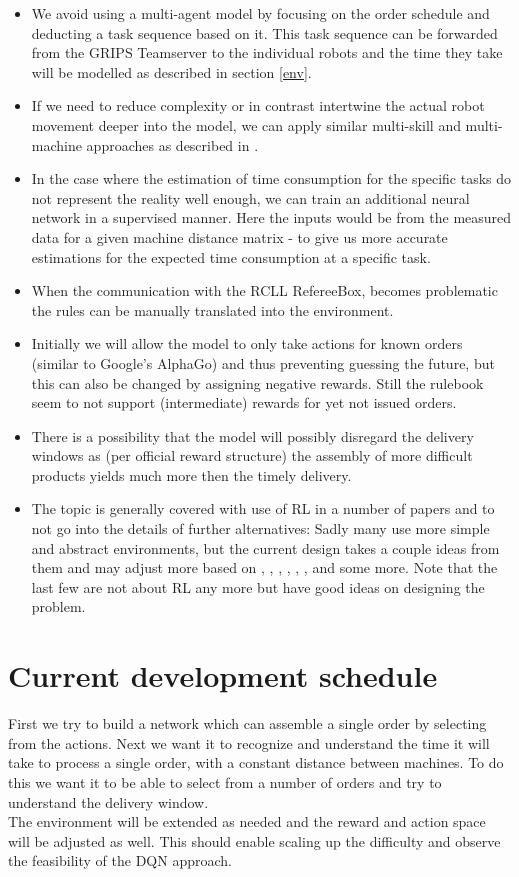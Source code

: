\documentclass[runningheads,envcountsect]{llncs}
\begin{document}
\begin{itemize}
  \item We avoid using a multi-agent model by focusing on the order schedule and deducting a task sequence based on it. This task sequence can be forwarded from the GRIPS Teamserver to the individual robots and the time they take will be modelled as described in section \ref{env}.
  \item If we need to reduce complexity or in contrast intertwine the actual robot movement deeper into the model, we can apply similar multi-skill and multi-machine approaches as described in \cite{qu2016optimized}.
  \item In the case where the estimation of time consumption for the specific tasks do not represent the reality well enough, we can train an additional neural network in a supervised manner. Here the inputs would be from the measured data for a given machine distance matrix - to give us more accurate estimations for the expected time consumption at a specific task.
  \item When the communication with the RCLL RefereeBox, becomes problematic the rules can be manually translated into the environment.
  \item Initially we will allow the model to only take actions for known orders (similar to Google's AlphaGo) and thus preventing guessing the future, but this can also be changed by assigning negative rewards. Still the rulebook seem to not support (intermediate) rewards for yet not issued orders.
  \item There is a possibility that the model will possibly disregard the delivery windows as (per official reward structure) the assembly of more difficult products yields much more then the timely delivery.
  \item The topic is generally covered with use of RL in a number of papers and to not go into the details of further alternatives: Sadly many use more simple and abstract environments, but the current design takes a couple ideas from them and may adjust more based on \cite{glaubius2012real}, \cite{shiue2018real}, \cite{waschneck2018optimization}, \cite{wu2011novel}, \cite{shahrabi2017reinforcement}, \cite{sharma2015performance}, \cite{lin2015simulation} and some more. Note that the last few are not about RL any more but have good ideas on designing the problem. 
\end{itemize}


\section{Current development schedule}
First we try to build a network which can assemble a single order by selecting from the actions. Next we want it to recognize and understand the time it will take to process a single order, with a constant distance between machines. To do this we want it to be able to select from a number of orders and try to understand the delivery window.\\
The environment will be extended as needed and the reward and action space will be adjusted as well. This should enable scaling up the difficulty and observe the feasibility of the DQN approach.


\vspace{24pt}



\end{document}
